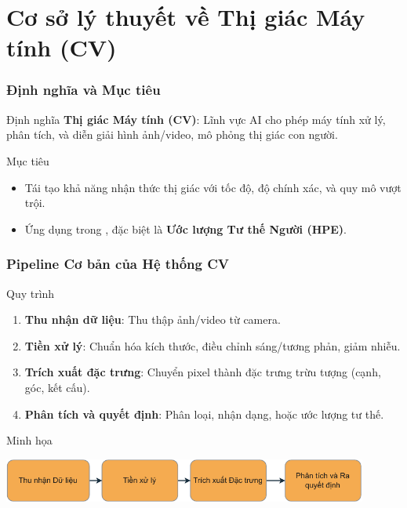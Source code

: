 
\section{Cơ sở lý thuyết về Thị giác Máy tính (CV)}
\begin{frame}
\frametitle{Định nghĩa và Mục tiêu}
\begin{block}{Định nghĩa}
\textbf{Thị giác Máy tính (CV)}: Lĩnh vực AI cho phép máy tính xử lý, phân tích, và diễn giải hình ảnh/video, mô phỏng thị giác con người.
\end{block}

\begin{block}{Mục tiêu}
\begin{itemize}
\item Tái tạo khả năng nhận thức thị giác với tốc độ, độ chính xác, và quy mô vượt trội.
\item Ứng dụng trong \TENLUANVAN, đặc biệt là \textbf{Ước lượng Tư thế Người (HPE)}.
\end{itemize}
\end{block}
\end{frame}

\begin{frame}
\frametitle{Pipeline Cơ bản của Hệ thống CV}
\begin{block}{Quy trình}
\begin{enumerate}
\item \textbf{Thu nhận dữ liệu}: Thu thập ảnh/video từ camera.
\item \textbf{Tiền xử lý}: Chuẩn hóa kích thước, điều chỉnh sáng/tương phản, giảm nhiễu.
\item \textbf{Trích xuất đặc trưng}: Chuyển pixel thành đặc trưng trừu tượng (cạnh, góc, kết cấu).
\item \textbf{Phân tích và quyết định}: Phân loại, nhận dạng, hoặc ước lượng tư thế.
\end{enumerate}
\end{block}

\begin{exampleblock}{Minh họa}
\begin{center}
\includegraphics[width=0.9\textwidth]{images/vision_flow-crop.pdf}
\caption{Quy trình tổng thể của hệ thống CV.}
\label{fig:cv_pipeline}
\end{center}
\end{exampleblock}
\end{frame}

